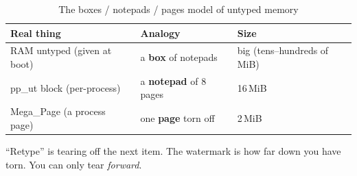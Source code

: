 \begin{table}[ht]
\centering
\begin{tabular}{@{}lll@{}}
    \toprule
    \textbf{Real thing} & \textbf{Analogy} & \textbf{Size} \\
    \midrule
    RAM untyped (given at boot) & a \textbf{box} of notepads      & big (tens--hundreds of MiB) \\
    pp\_ut block (per-process)  & a \textbf{notepad} of 8 pages   & 16\,MiB \\
    Mega\_Page (a process page) & one \textbf{page} torn off      & 2\,MiB \\
    \bottomrule
\end{tabular}
\caption{The boxes / notepads / pages model of untyped memory}
\label{tab:carve-analogy}
\end{table}

``Retype'' is tearing off the next item. The watermark is how far down
you have torn. You can only tear \emph{forward}.

